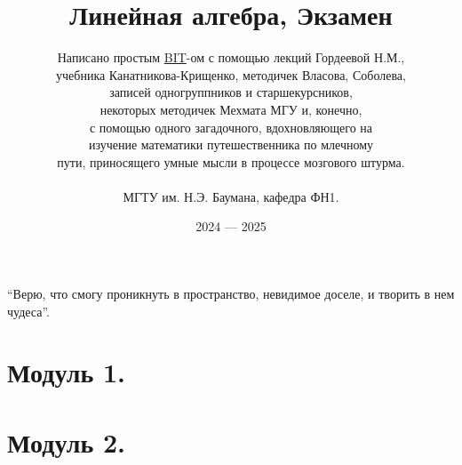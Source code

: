 \documentclass[a4papper]{article}
\title{\Huge Линейная алгебра, Экзамен}
\author{
    Написано простым \href{https://t.me/Borislav_Timoshin}{BIT}-ом с помощью лекций Гордеевой Н.М., \\ 
    учебника Канатникова-Крищенко, методичек Власова, Соболева, \\
    записей одногруппников и старшекурсников,\\ некоторых методичек Мехмата МГУ и, конечно, \\ с помощью одного загадочного, вдохновляющего на \\ изучение математики путешественника по млечному \\ пути, приносящего умные мысли в процессе мозгового штурма. 
    \\
    \\
    МГТУ им. Н.Э. Баумана, кафедра ФН1.
}
\date{2024 — 2025}
\begin{document}
    \pagestyle{fancy}
    \fancyhead[L]{\thepage}

    \maketitle

    \epigraph{
        ``Верю, что смогу проникнуть в пространство, невидимое доселе, и творить в нем чудеса''.
    }{}
        
    \tableofcontents

    \label{toc}

    \newpage

    \Hide
    
    \part{Модуль 1.}

    
    
    
    
    
    
    
    
    
    
    
    
    
    
    
    
    
    
    
    

    \part{Модуль 2.}

    
    
    
    
    
    
    
    
    
    
    
    
    
    
    
    
    
    
    
    
\end{document}
